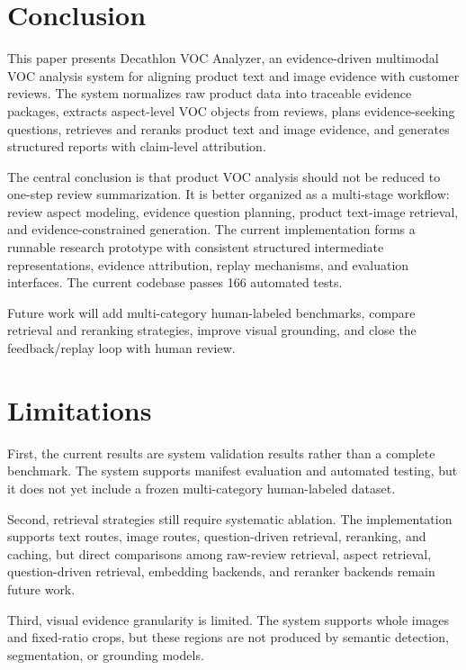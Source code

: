 \documentclass[11pt]{article}
\begin{document}
\section{Conclusion}
This paper presents Decathlon VOC Analyzer, an evidence-driven multimodal VOC analysis system for aligning product text and image evidence with customer reviews. The system normalizes raw product data into traceable evidence packages, extracts aspect-level VOC objects from reviews, plans evidence-seeking questions, retrieves and reranks product text and image evidence, and generates structured reports with claim-level attribution.

The central conclusion is that product VOC analysis should not be reduced to one-step review summarization. It is better organized as a multi-stage workflow: review aspect modeling, evidence question planning, product text-image retrieval, and evidence-constrained generation. The current implementation forms a runnable research prototype with consistent structured intermediate representations, evidence attribution, replay mechanisms, and evaluation interfaces. The current codebase passes 166 automated tests.

Future work will add multi-category human-labeled benchmarks, compare retrieval and reranking strategies, improve visual grounding, and close the feedback/replay loop with human review.

\section{Limitations}
First, the current results are system validation results rather than a complete benchmark. The system supports manifest evaluation and automated testing, but it does not yet include a frozen multi-category human-labeled dataset.

Second, retrieval strategies still require systematic ablation. The implementation supports text routes, image routes, question-driven retrieval, reranking, and caching, but direct comparisons among raw-review retrieval, aspect retrieval, question-driven retrieval, embedding backends, and reranker backends remain future work.

Third, visual evidence granularity is limited. The system supports whole images and fixed-ratio crops, but these regions are not produced by semantic detection, segmentation, or grounding models.
\end{document}
